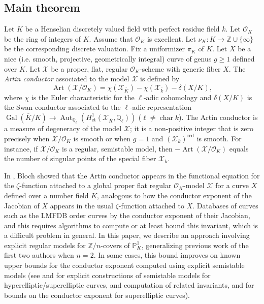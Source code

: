 \documentclass[12pt]{amsart}
\numberwithin{equation}{section}
\theoremstyle{definition}
\newcommand{\mc}[1]{\mathcal{#1}}
\newcommand{\Q}{\mathbb Q}
\newcommand{\Z}{\mathbb Z}
\newcommand{\ints}{\mathbb Z}
\newcommand{\proj}{\mathbb P}
\DeclareMathOperator{\Gal}{Gal}
\DeclareMathOperator{\cha}{char}
\DeclareMathOperator{\Art}{Art}
\DeclareMathOperator{\Aut}{Aut}
\begin{document}
\subsection{Main theorem}\label{Smain}
Let $K$ be a Henselian discretely valued field with perfect residue field
$k$. Let $\mc{O}_K$ be the ring of integers of $K$. Assume that
$\mc{O}_K$ is excellent. Let $\nu_K \colon K \rightarrow \Z \cup \{ \infty
\}$ be the corresponding discrete valuation.  Fix a uniformizer
$\pi_K$ of $K$.  Let $X$ be a nice (i.e. smooth,
projective, geometrically integral) curve of genus $g \geq 1$ defined
over $K$.  Let $\mc{X}$ be a proper,
flat, regular $\mc{O}_K$-scheme with generic fiber $X$. The \emph{Artin conductor} associated to the model $\mc{X}$ is defined by
\[ \Art (\mc{X}/\mc{O}_K) =  \chi(\mc{X}_{\overline{K}}) - \chi(\mc{X}_{\overline{k}}) - \delta(X/K) ,\]
where $\chi$ is the Euler characteristic for the $\ell$-adic cohomology and $\delta(X/K)$ is the Swan conductor associated to the $\ell$-adic representation $\Gal (\overline{K}/K) \rightarrow \Aut_{\Q_\ell}
(H^1_{\mathrm{et}}(\mc{X}_{\overline{K}}, \Q_\ell))$ ($\ell \neq \cha k$). The Artin conductor is a measure of degeneracy of the model $\mc{X}$; it is a non-positive integer that is zero precisely when
$\mc{X}/\mc{O}_K$ is smooth or when $g=1$ and
$(\mc{X}_k)^{\mathrm{red}}$ is smooth. For instance, if $\mc{X}/\mc{O}_K$ is a regular, semistable model, then $-\Art(\mc{X}/\mc{O}_K)$ equals the number of singular points of the special fiber $\mc{X}_k$. 

In \cite[Proposition~1.1]{Bloch}, Bloch showed that the Artin conductor appears in the functional equation for the $\zeta$-function attached to a global proper flat regular $\mc{O}_K$-model $\mc{X}$ for a curve $X$ defined over a number field $K$, analogous to how the conductor exponent of the Jacobian of $X$ appears in the usual $\zeta$-function attached to $X$. Databases of curves such as the LMFDB \cite{LMFDB} order curves by the conductor exponent of their Jacobian, and this requires algorithms to compute or at least bound this invariant, which is a difficult problem in general.  In this paper, we describe an approach involving explicit regular models for $\ints/n$-covers of $\proj^1_K$, generalizing previous work of the first two authors when $n=2$. In some cases, this bound improves on known upper bounds for the conductor exponent computed using explicit semistable models (see \cite{DDMM} and \cite{BW_Glasgow} for explicit constructions of semistable models for hyperelliptic/superelliptic curves, and computation of related invariants, and \cite{Kohls} for bounds on the conductor exponent for superelliptic curves). 
\end{document}
